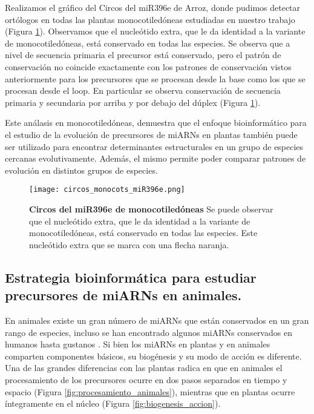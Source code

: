 Realizamos el gráfico del Circos del miR396e de Arroz, donde pudimos detectar ortólogos en todas las plantas monocotiledóneas estudiadas en nuestro trabajo (Figura \ref{fig:circos_monocots_miR396e}).
Observamos que el nucleótido extra, que le da identidad a la variante de monocotiledóneas, está conservado en todas las especies.
Se observa que a nivel de secuencia primaria el precursor está conservado, pero el patrón de conservación no coincide exactamente con los patrones de conservación vistos anteriormente para los precursores que se procesan desde la base como los que se procesan desde el loop.
En particular se observa conservación de secuencia primaria y secundaria por arriba y por debajo del dúplex (Figura \ref{fig:circos_monocots_miR396e}).

Este análasis en monocotiledóneas, demuestra que el enfoque bioinformático para el estudio de la evolución de precursores de miARNs en plantas también puede ser utilizado para encontrar determinantes estructurales en un grupo de especies cercanas evolutivamente.  
Además, el mismo permite poder comparar patrones de evolución en distintos grupos de especies.

\begin{figure}[htbp!] 
    \centering    
    \texttt{[image: circos\_monocots\_miR396e.png]}
    \caption[Circos del miR172a]{
    \textbf{Circos del miR396e de monocotiledóneas}
    Se puede observar que el nucleótido extra, que le da identidad a la variante de monocotiledóneas, está conservado en todas las especies.
    Este nucleótido extra que se marca con una flecha naranja.
    }
     \label{fig:circos_monocots_miR396e}
\end{figure}

\subsection{Estrategia bioinformática para estudiar precursores de miARNs en animales.}

En animales existe un gran número de miARNs que están conservados en un gran rango de especies, incluso se han encontrado algunos miARNs conservados en humanos hasta gustanos \citep{pmid11081512}.
Si bien los miARNs en plantas y en animales comparten componentes básicos, su biogénesis y su modo de acción es diferente.
Una de las grandes diferencias con las plantas radica en que en animales el procesamiento de los precursores ocurre en dos pasos separados
en tiempo y espacio (Figura \ref{fig:procesamiento_animales}), mientras que en plantas ocurre íntegramente en el núcleo (Figura \ref{fig:biogenesis_accion}).

